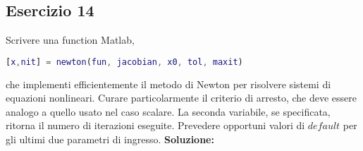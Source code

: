 \subsection{Esercizio 14}
Scrivere una function Matlab,
\begin{lstlisting}[language=Matlab]
[x,nit] = newton(fun, jacobian, x0, tol, maxit)
\end{lstlisting}
che implementi efficientemente il metodo di Newton per risolvere sistemi di equazioni nonlineari.
Curare particolarmente il criterio di arresto, che deve essere analogo a quello usato nel caso scalare.
La seconda variabile, se specificata, ritorna il numero di iterazioni eseguite. Prevedere opportuni
valori di $default$ per gli ultimi due parametri di ingresso.
\newline \textbf{Soluzione:} \newline

